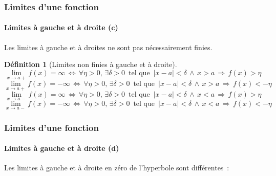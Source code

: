 \documentclass[10pt,notheorems]{beamer}
\theoremstyle{plain}
\theoremstyle{definition} %
\newtheorem{definition}{Définition}
\begin{document}
\begin{frame}
  \frametitle{Limites d'une fonction}
  \framesubtitle{Limites à gauche et à droite (c)}

  \bigskip

  Les limites à gauche et à droites ne sont pas nécessairement finies.

  \bigskip

  \begin{definition}[Limites non finies à gauche et à droite]
    {\small
      \[
        \lim_{x\rightarrow a+}f(x) = \infty \,\Leftrightarrow\, \forall \eta>0,\, \exists \delta>0\,\text{ tel que }\, |x-a|<\delta\,\land\,x>a\,\Rightarrow\, f(x)>\eta
      \]
      \[
        \lim_{x\rightarrow a+}f(x) = -\infty \,\Leftrightarrow\, \forall \eta>0,\, \exists \delta>0\,\text{ tel que }\, |x-a|<\delta\,\land\,x>a\,\Rightarrow\, f(x)<-\eta
      \]
      \[
        \lim_{x\rightarrow a-}f(x) = \infty \,\Leftrightarrow\, \forall \eta>0,\, \exists \delta>0\,\text{ tel que }\, |x-a|<\delta\,\land\,x<a\,\Rightarrow\, f(x)>\eta
      \]
      \[
        \lim_{x\rightarrow a-}f(x) = -\infty \,\Leftrightarrow\, \forall \eta>0,\, \exists \delta>0\,\text{ tel que }\, |x-a|<\delta\,\land\,x<a\,\Rightarrow\, f(x)<-\eta
      \]
    }
  \end{definition}

\end{frame}


\begin{frame}
  \frametitle{Limites d'une fonction}
  \framesubtitle{Limites à gauche et à droite (d)}

  \bigskip

  Les limites à gauche et à droite en zéro de l'hyperbole sont différentes~:

  \bigskip

  \begin{center}
  \end{center}

\end{frame}
\end{document}
